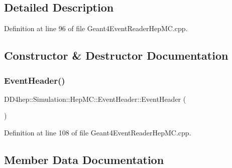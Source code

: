 \subsection{Detailed Description}


Definition at line 96 of file Geant4\+Event\+Reader\+Hep\+M\+C.\+cpp.



\subsection{Constructor \& Destructor Documentation}
\hypertarget{class_d_d4hep_1_1_simulation_1_1_hep_m_c_1_1_event_header_a7e32471a0f8b744e116a1ae9d0d7e620}{}\label{class_d_d4hep_1_1_simulation_1_1_hep_m_c_1_1_event_header_a7e32471a0f8b744e116a1ae9d0d7e620} 
\subsubsection{\texorpdfstring{Event\+Header()}{EventHeader()}}
{\footnotesize\ttfamily D\+D4hep\+::\+Simulation\+::\+Hep\+M\+C\+::\+Event\+Header\+::\+Event\+Header (\begin{DoxyParamCaption}{ }\end{DoxyParamCaption})\hspace{0.3cm}{\ttfamily [inline]}}



Definition at line 108 of file Geant4\+Event\+Reader\+Hep\+M\+C.\+cpp.



\subsection{Member Data Documentation}
\hypertarget{class_d_d4hep_1_1_simulation_1_1_hep_m_c_1_1_event_header_aa21d0c781608de75c13594b41011c043}{}\label{class_d_d4hep_1_1_simulation_1_1_hep_m_c_1_1_event_header_aa21d0c781608de75c13594b41011c043} 
